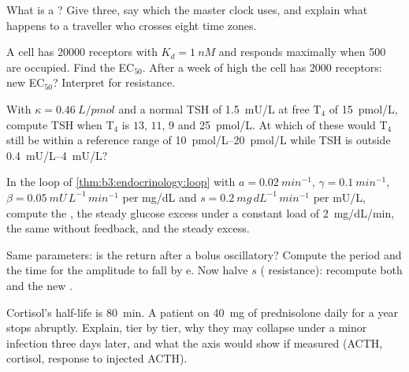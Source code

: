\begin{exercise}[$\star$]\label{exo:b3:endocrinology:4}
What is a ? Give three, say which the master clock uses, and
explain what happens to a traveller who crosses eight time zones.
\end{exercise}

\begin{exercise}[$\star\star$]\label{exo:b3:endocrinology:5}
A cell has \num{20000} receptors with $K_{d} = \qty{1}{nM}$ and responds
maximally when \num{500} are occupied. Find the EC$_{50}$. After a week
of high  the cell has \num{2000} receptors: new EC$_{50}$?
Interpret for  resistance.
\end{exercise}

\begin{exercise}[$\star\star$]\label{exo:b3:endocrinology:6}
With $\kappa = \qty{0.46}{L/pmol}$ and a normal TSH of \qty{1.5}{mU/L}
at free T$_{4}$ of \qty{15}{pmol/L}, compute TSH when T$_{4}$ is $13$,
$11$, $9$ and \qty{25}{pmol/L}. At which of these would T$_{4}$ still
be within a reference range of \qtyrange{10}{20}{pmol/L} while TSH is
outside \qtyrange{0.4}{4}{mU/L}?
\end{exercise}

\begin{exercise}[$\star\star$]\label{exo:b3:endocrinology:7}
In the loop of \cref{thm:b3:endocrinology:loop} with $a = \qty{0.02}{min^{-1}}$,
$\gamma = \qty{0.1}{min^{-1}}$, $\beta = \qty{0.05}{mU\,L^{-1}\,min^{-1}}$
per mg/dL and $s = \qty{0.2}{mg\,dL^{-1}\,min^{-1}}$ per mU/L, compute
the , the steady glucose excess under a constant load of
\qty{2}{mg/dL/min}, the same without feedback, and the steady 
excess.
\end{exercise}

\begin{exercise}[$\star\star$]\label{exo:b3:endocrinology:8}
Same parameters: is the return after a bolus oscillatory? Compute the
period and the time for the amplitude to fall by $\mathrm{e}$. Now halve
$s$ ( resistance): recompute both and the new .
\end{exercise}

\begin{exercise}[$\star\star$]\label{exo:b3:endocrinology:9}
Cortisol's half-life is \qty{80}{min}. A patient on \qty{40}{mg} of
prednisolone daily for a year stops abruptly. Explain, tier by tier,
why they may collapse under a minor infection three days later, and
what the axis would show if measured (ACTH, cortisol, response to
injected ACTH).
\end{exercise}


